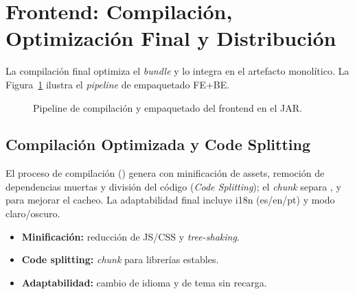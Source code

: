 \section{Frontend: Compilación, Optimización Final y Distribución}
\label{sec:s5_frontend}

La compilación final optimiza el \textit{bundle} y lo integra en el artefacto monolítico. La
Figura~\ref{fig:s5_build} ilustra el \textit{pipeline} de empaquetado FE+BE.\par

\begin{figure}[!ht]
    \centering
    \caption{Pipeline de compilación y empaquetado del frontend en el JAR.}
    \label{fig:s5_build}
\end{figure}

\subsection{Compilación Optimizada y Code Splitting}
\label{ssec:s5_fe_build}
El proceso de compilación () genera  con
minificación de assets, remoción de dependencias muertas y división del código
(\textit{Code Splitting}); el \textit{chunk}  separa ,
 y  para mejorar el cacheo. La adaptabilidad final
incluye i18n (es/en/pt) y modo claro/oscuro.

\begin{itemize}[noitemsep]
    \item \textbf{Minificación:} reducción de JS/CSS y \textit{tree-shaking}.
    \item \textbf{Code splitting:} \textit{chunk}  para librerías estables.
    \item \textbf{Adaptabilidad:} cambio de idioma y de tema sin recarga.
\end{itemize}

